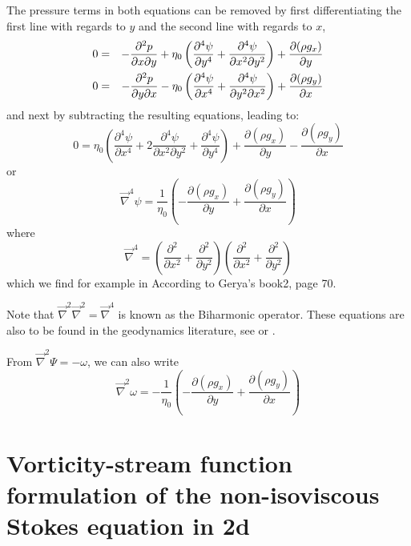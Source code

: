 The pressure terms in both equations can be removed by first differentiating
the first line with regards to $y$ and the second line with regards to $x$, 
\begin{eqnarray}
0 &=& -\frac{\partial^2 p}{\partial x\partial y} + \eta_0 \left(
\frac{\partial^4 \psi}{\partial y^4}  + \frac{\partial^4 \psi}{\partial x^2 \partial y^2} 
\right) + \frac{\partial (\rho g_x)}{\partial y} \nonumber\\
0 &=& -\frac{\partial^2 p}{\partial y \partial x} - \eta_0 \left(
\frac{\partial^4 \psi}{\partial x^4}  + \frac{\partial^4 \psi}{\partial y^2 \partial x^2} 
\right) + \frac{\partial (\rho g_y)}{\partial x}
\end{eqnarray}
and next by subtracting the resulting equations, leading to:
\begin{equation}
0 = \eta_0
\left(
\frac{\partial^4 \psi}{\partial x^4} 
+
2\frac{\partial^4 \psi}{\partial x^2\partial y^2} 
+
\frac{\partial^4 \psi}{\partial y^4}
\right)
+\frac{\partial (\rho g_x)}{\partial y}
-\frac{\partial (\rho g_y)}{\partial x}
\end{equation}
or
\begin{equation}
\boxed{
\vec\nabla^4 \psi = \frac{1}{\eta_0} \left( -\frac{\partial (\rho g_x)}{\partial y}
+\frac{\partial (\rho g_y)}{\partial x} \right)
}
\end{equation}
where
\[
\vec\nabla^4 =
\left(
\frac{\partial^2 }{\partial x^2} + \frac{\partial^2 }{\partial y^2}
\right)
\left(
\frac{\partial^2 }{\partial x^2} + \frac{\partial^2 }{\partial y^2}
\right)
\]
which we find for example in 
According to Gerya's book2, page 70.

Note that $\vec\nabla^2 \vec\nabla^2 = \vec\nabla^4 $ is known as the {\color{olive}Biharmonic operator}.
These equations are also to be found in the geodynamics literature, 
see \textcite[eq. 1.43]{tack10} or \textcite[p 70-71]{gery10}.

From $\vec\nabla^2 \Psi = -\omega $, we can also write
\begin{equation}
\vec\nabla^2 \omega = -\frac{1}{\eta_0} \left( -\frac{\partial (\rho g_x)}{\partial y}
+\frac{\partial (\rho g_y)}{\partial x} \right)
\end{equation}



\section{Vorticity-stream function formulation of the non-isoviscous Stokes equation in 2d}

